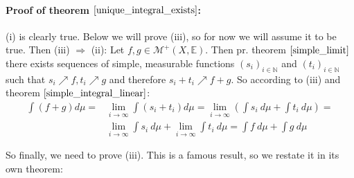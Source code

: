 \documentclass[12pt, a4paper]{article}
\numberwithin{equation}{section}
\begin{document}
\paragraph{Proof of theorem $\ref{unique_integral_exists}$:}
(i) is clearly true. Below we will prove (iii), so for now we will assume it to be true. Then (iii) $\Rightarrow$ (ii): Let $f,g\in\mathcal{M}^+(X,\mathbb{E})$. Then pr. theorem $\ref{simple_limit}$ there exists sequences of simple, measurable functions $(s_i)_{i\in\mathbb{N}}$ and $(t_i)_{i\in\mathbb{N}}$ such that $s_i\nearrow f, t_i\nearrow g$ and therefore $s_i+t_i\nearrow f+g$. So according to (iii) and theorem $\ref{simple_integral_linear}$:
\begin{align}
\int(f+g)d\mu=&\underset{i\rightarrow\infty}{\lim}\int(s_i+t_i)d\mu=\underset{i\rightarrow\infty}{\lim}\left(\int s_i\ d\mu+\int t_i\ d\mu\right)=\\
&\underset{i\rightarrow\infty}{\lim}\int s_i\ d\mu+\underset{i\rightarrow\infty}{\lim}\int t_i\ d\mu=\int f\ d\mu+\int g\ d\mu
\end{align}

So finally, we need to prove (iii). This is a famous result, so we restate it in its own theorem:
\end{document}

